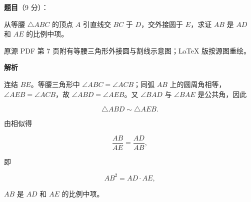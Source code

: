 \begin{answer}

\textbf{题目}（9 分）：

从等腰 $\triangle ABC$ 的顶点 $A$ 引直线交 $BC$ 于 $D$，交外接圆于 $E$，求证 $AB$ 是 $AD$ 和 $AE$ 的比例中项。

\begin{gktip}
原源 PDF 第 7 页附有等腰三角形外接圆与割线示意图；LaTeX 版按源图重绘。
\end{gktip}
\nopagebreak[4]
\begin{center}\end{center}
\nopagebreak[4]
\textbf{解析}

连结 $BE$。等腰三角形中 $\angle ABC=\angle ACB$；同弧 $AB$ 上的圆周角相等，$\angle AEB=\angle ACB$，故 $\angle ABD=\angle AEB$。又 $\angle BAD$ 与 $\angle BAE$ 是公共角，因此

\nopagebreak[4]
\[
\triangle ABD\sim\triangle AEB.
\]

由相似得

\nopagebreak[4]
\[
\frac{AB}{AE}=\frac{AD}{AB},
\]

即

\nopagebreak[4]
\[
AB^2=AD\cdot AE,
\]

$AB$ 是 $AD$ 和 $AE$ 的比例中项。
\nopagebreak[4]
\begin{center}\end{center}
\nopagebreak[4]

\end{answer}
